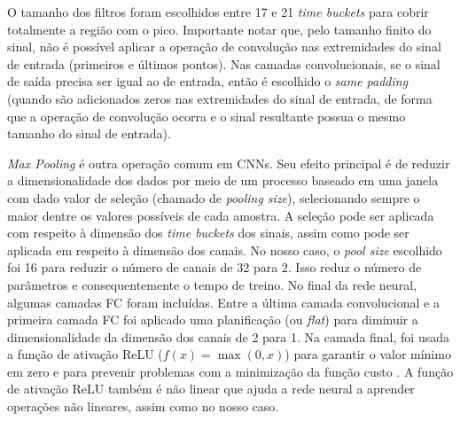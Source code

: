 \documentclass[a4paper,12pt,oneside]{book}
\begin{document}
\par O tamanho dos filtros foram escolhidos entre 17 e 21 \textit{time buckets} para cobrir totalmente a região com o pico. Importante notar que, pelo tamanho finito do sinal, não é possível aplicar a operação de convolução nas extremidades do sinal de entrada (primeiros e últimos pontos). Nas camadas convolucionais, se o sinal de saída precisa ser igual ao de entrada, então é escolhido o \textit{same padding} (quando são adicionados zeros nas extremidades do sinal de entrada, de forma que a operação de convolução ocorra e o sinal resultante possua o mesmo tamanho do sinal de entrada).

\par \textit{Max Pooling} é outra operação comum em CNNs. Seu efeito principal é de reduzir a dimensionalidade dos dados por meio de um processo baseado em uma janela com dado valor de seleção (chamado de \textit{pooling size}), selecionando sempre o maior dentre os valores possíveis de cada amostra. A seleção pode ser aplicada com respeito à dimensão dos \textit{time buckets} dos sinais, assim como pode ser aplicada em respeito à dimensão dos canais. No nosso caso, o \textit{pool size} escolhido foi 16 para reduzir o número de canais de 32 para 2. Isso reduz o número de parâmetros e consequentemente o tempo de treino. No final da rede neural, algumas camadas FC foram incluídas. Entre a última camada convolucional e a primeira camada FC foi aplicado uma planificação (ou \textit{flat}) para diminuir a dimensionalidade da dimensão dos canais de 2 para 1.  Na camada final, foi usada a função de ativação ReLU ($f(x) = \max(0, x)$) para garantir o valor mínimo em zero e para prevenir problemas com a minimização da função custo \cite{VGP}. A função de ativação ReLU também é não linear que ajuda a rede neural a aprender operações não lineares, assim como no nosso caso.

\end{document}
